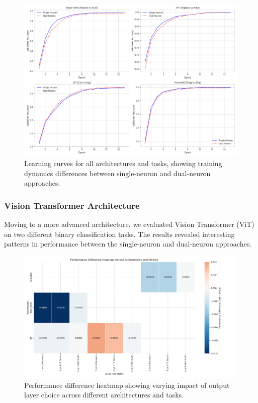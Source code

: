 \documentclass[11pt]{article}
\begin{document}
\begin{figure}[htbp]
\centering
\includegraphics[width=\textwidth]{figures/learning_curves.png}
\caption{Learning curves for all architectures and tasks, showing training dynamics differences between single-neuron and dual-neuron approaches.}
\end{figure}

\subsubsection{Vision Transformer Architecture}
Moving to a more advanced architecture, we evaluated Vision Transformer (ViT) on two different binary classification tasks. The results revealed interesting patterns in performance between the single-neuron and dual-neuron approaches.

\begin{figure}[htbp]
\centering
\includegraphics[width=\textwidth]{figures/performance_difference_heatmap.png}
\caption{Performance difference heatmap showing varying impact of output layer choice across different architectures and tasks.}
\end{figure}
\end{document}
